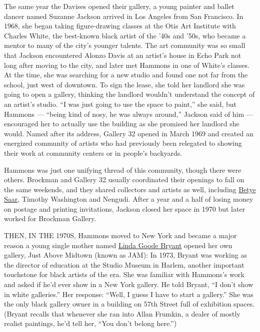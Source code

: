The same year the Davises opened their gallery, a young painter and
ballet dancer named Suzanne Jackson arrived in Los Angeles from San
Francisco. In 1968, she began taking figure-drawing classes at the Otis
Art Institute with Charles White, the best-known black artist of the
'40s and '50s, who became a mentor to many of the city's younger
talents. The art community was so small that Jackson encountered Alonzo
Davis at an artist's house in Echo Park not long after moving to the
city, and later met Hammons in one of White's classes. At the time, she
was searching for a new studio and found one not far from the school,
just west of downtown. To sign the lease, she told her landlord she was
going to open a gallery, thinking the landlord wouldn't understand the
concept of an artist's studio. ``I was just going to use the space to
paint,'' she said, but Hammons --- ``being kind of nosy, he was always
around,'' Jackson said of him --- encouraged her to actually use the
building as she promised her landlord she would. Named after its
address, Gallery 32 opened in March 1969 and created an energized
community of artists who had previously been relegated to showing their
work at community centers or in people's backyards.

Hammons was just one unifying thread of this community, though there
were others. Brockman and Gallery 32 usually coordinated their openings
to fall on the same weekends, and they shared collectors and artists as
well, including
\href{https://www.nytimes.com/2019/09/04/arts/design/betye-saar.html}{Betye
Saar}, Timothy Washington and Nengudi. After a year and a half of losing
money on postage and printing invitations, Jackson closed her space in
1970 but later worked for Brockman Gallery.

THEN, IN THE 1970S, Hammons moved to New York and became a major reason
a young single mother named
\href{https://www.nytimes.com/2019/10/11/nyregion/linda-goode-bryant-project-eats.html}{Linda
Goode Bryant} opened her own gallery, Just Above Midtown (known as JAM):
In 1973, Bryant was working as the director of education at the Studio
Museum in Harlem, another important touchstone for black artists of the
era. She was familiar with Hammons's work and asked if he'd ever show in
a New York gallery. He told Bryant, ``I don't show in white galleries.''
Her response: ``Well, I guess I have to start a gallery.'' She was the
only black gallery owner in a building on 57th Street full of exhibition
spaces. (Bryant recalls that whenever she ran into Allan Frumkin, a
dealer of mostly realist paintings, he'd tell her, ``You don't belong
here.'')

